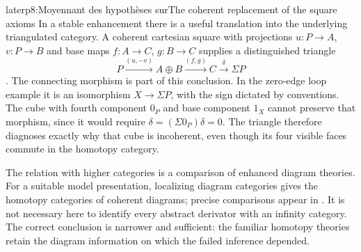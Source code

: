 \begin{dcomment}{later}{p8:Moyennant des hypothèses sur}{The coherent replacement of the square axioms}
In a stable enhancement there is a useful translation into the underlying triangulated category. A coherent cartesian square with projections $u:P\to A$, $v:P\to B$ and base maps $f:A\to C$, $g:B\to C$ supplies a distinguished triangle
\[
 P\xrightarrow{(u,-v)}A\oplus B
 \xrightarrow{(f,g)}C\xrightarrow{\delta}\Sigma P
\]
\citep[Theorem~6.1, arXiv v2]{GrothPontoShulman2014}. The connecting morphism is part of this conclusion. In the zero-edge loop example it is an isomorphism $X\to\Sigma P$, with the sign dictated by conventions. The cube with fourth component $0_P$ and base component $1_X$ cannot preserve that morphism, since it would require $\delta=(\Sigma0_P)\delta=0$. The triangle therefore diagnoses exactly why that cube is incoherent, even though its four visible faces commute in the homotopy category.

The relation with higher categories is a comparison of enhanced diagram theories. For a suitable model presentation, localizing diagram categories gives the homotopy categories of coherent diagrams; precise comparisons appear in \citet[Propositions~1.3.4.24--1.3.4.25]{Lurie2017HA}. It is not necessary here to identify every abstract derivator with an infinity category. The correct conclusion is narrower and sufficient: the familiar homotopy theories retain the diagram information on which the failed inference depended.
\end{dcomment}
